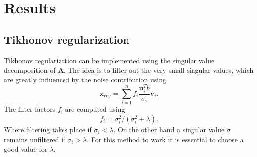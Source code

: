 \section{Results}
\subsection{Tikhonov regularization}
Tikhonov regularization can be implemented using the singular value decomposition of $\mathbf{A}$. The idea is to filter out the very small singular values, which are greatly influenced by the noise contribution using
\begin{equation}
\mathbf{x}_{reg} = \sum_{i=1}^{n}f_i \frac{\mathbf{u}_{i}^T b}{\sigma_i}\mathbf{v}_{i} .
\label{eq:tikh}
\end{equation}
The filter factors $f_i$ are computed using
\begin{equation}
f_i = \sigma_i^2/(\sigma_i^2 + \lambda).
\label{eq:filter}
\end{equation}
Where filtering takes place if $\sigma_i < \lambda$. On the other hand a singular value $\sigma$ remains unfiltered if $\sigma_i > \lambda$. 
For this method to work it is essential to choose a good value for $\lambda$. 
